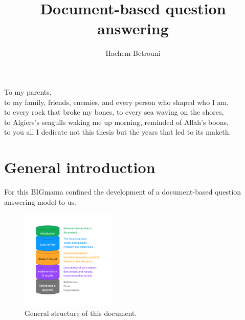 \documentclass[a4paper,12pt]{article}
\author{Hachem Betrouni}
\title{Document-based question answering}
\begin{document}
\maketitle

\clearpage
\begin{center}
    \thispagestyle{empty}
    \vspace*{\fill}
    To my parents,\\
    to my family, friends, enemies, and every person who shaped who I am, \\
    to every rock that broke my bones, to every sea waving on the shores, \\  
    to Algiers's seagulls waking me up morning, reminded of Allah's boons,\\
    to you all I dedicate not this thesis but the years that led to its maketh.\\
    \vspace*{\fill}
\end{center}
\clearpage


\onecolumn
\tableofcontents
\listoffigures
\listoftables

\newpage
\printglossary[type=\acronymtype, title=List of acronyms]

\newpage

\section{General introduction}
For this BIGmama confined the development of a document-based question answering model to us.

\begin{figure}[h]
    \begin{center}
      \includegraphics[width=0.4\textwidth]{figures/plan.png}
    \end{center}
  \caption{General structure of this document.}
    \label{fig:plan}
\end{figure}
\end{document}
